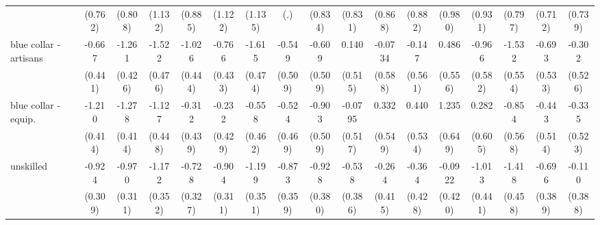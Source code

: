 {\begin{tabular}{l*{16}{c}}
                    &     (0.762)         &     (0.808)         &     (1.132)         &     (0.885)         &     (1.122)         &     (1.135)         &         (.)         &     (0.834)         &     (0.831)         &     (0.868)         &     (0.882)         &     (0.980)         &     (0.931)         &     (0.797)         &     (0.712)         &     (0.739)         \\
[1em]
blue collar - artisans&      -0.667         &      -1.261\sym{**} &      -1.522\sym{**} &      -1.026\sym{*}  &      -0.766         &      -1.615\sym{***}&      -0.549         &      -0.609         &       0.140         &     -0.0734         &      -0.147         &       0.486         &      -0.966         &      -1.532\sym{**} &      -0.693         &      -0.302         \\
                    &     (0.441)         &     (0.426)         &     (0.476)         &     (0.444)         &     (0.433)         &     (0.474)         &     (0.509)         &     (0.509)         &     (0.515)         &     (0.588)         &     (0.561)         &     (0.556)         &     (0.582)         &     (0.554)         &     (0.533)         &     (0.526)         \\
[1em]
blue collar - equip.&      -1.210\sym{**} &      -1.278\sym{**} &      -1.127\sym{*}  &      -0.312         &      -0.232         &      -0.558         &      -0.524         &      -0.903         &     -0.0795         &       0.332         &       0.440         &       1.235         &       0.282         &      -0.854         &      -0.443         &      -0.335         \\
                    &     (0.414)         &     (0.414)         &     (0.448)         &     (0.439)         &     (0.429)         &     (0.462)         &     (0.469)         &     (0.509)         &     (0.517)         &     (0.549)         &     (0.534)         &     (0.649)         &     (0.605)         &     (0.568)         &     (0.514)         &     (0.523)         \\
[1em]
unskilled           &      -0.924\sym{**} &      -0.970\sym{**} &      -1.172\sym{***}&      -0.728\sym{*}  &      -0.904\sym{**} &      -1.199\sym{***}&      -0.873\sym{*}  &      -0.928\sym{*}  &      -0.538         &      -0.264         &      -0.364         &     -0.0922         &      -1.013\sym{*}  &      -1.418\sym{**} &      -0.696         &      -0.110         \\
                    &     (0.309)         &     (0.311)         &     (0.352)         &     (0.327)         &     (0.311)         &     (0.351)         &     (0.359)         &     (0.380)         &     (0.386)         &     (0.415)         &     (0.428)         &     (0.420)         &     (0.441)         &     (0.458)         &     (0.389)         &     (0.388)         \\

\end{tabular}}
